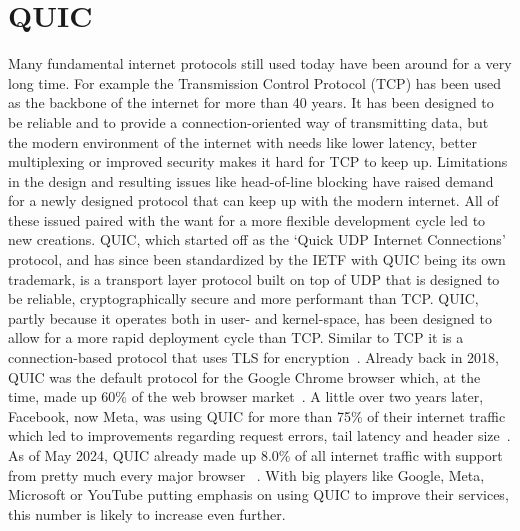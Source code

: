 \section{QUIC}\label{sec:quic_bg}
Many fundamental internet protocols still used today have been around for 
a very long time.
For example the Transmission Control Protocol (TCP) has been used as the backbone
of the internet for more than 40 years.
It has been designed to be reliable and to provide a connection-oriented
way of transmitting data, but the modern environment of the internet with
needs like lower latency, better multiplexing or improved security makes it 
hard for TCP to keep up.
Limitations in the design and resulting issues like head-of-line blocking
have raised demand for a newly designed protocol that can keep up with the
modern internet. %
All of these issued paired with the want for a more flexible development cycle
led to new creations.
QUIC, which started off as the `Quick UDP Internet Connections' protocol, and has 
since been standardized by the IETF with QUIC being its own trademark, is a 
transport layer protocol built on top of UDP that is designed to be reliable, 
cryptographically secure and more performant than TCP\@.
QUIC, partly because it operates both in user- and kernel-space, has been designed to allow for a 
more rapid deployment cycle than TCP\@.
Similar to TCP it is a connection-based protocol that uses TLS for encryption~\parencite{quic-explained}.
Already back in 2018, QUIC was the default protocol for the Google Chrome browser which,
at the time, made up 60\% of the web browser market~\parencite{google-quic-usage}.
A little over two years later, Facebook, now Meta, was using QUIC for more than 75\% of 
their internet traffic which led to improvements regarding
request errors, tail latency and header size~\parencite{facebook-quic-usage}.
As of May 2024, QUIC already made up 8.0\% of all internet traffic %
with support from pretty much every major browser
~\parencite{internet-quic-usage, article-quic-usage}.
With big players like Google, Meta, Microsoft or YouTube putting emphasis on
using QUIC to improve their services, this number is likely to increase even further.

